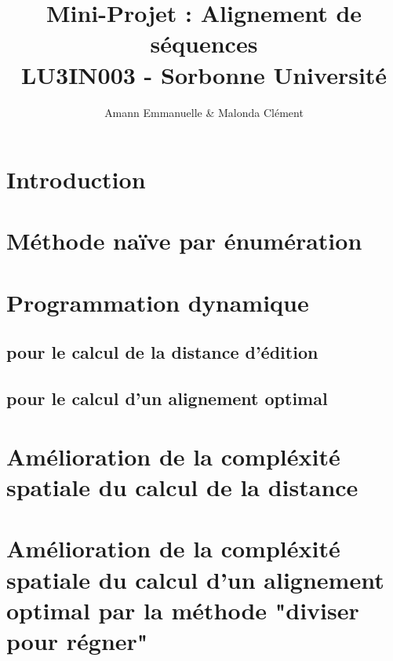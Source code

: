 \documentclass[12pt]{article}
\begin{document}
\title{Mini-Projet : Alignement de séquences \\ LU3IN003 - Sorbonne Université}
\author{Amann Emmanuelle \& Malonda Clément}
\maketitle
\tableofcontents
\newpage

\section{Introduction}

\section{Méthode naïve par énumération}

\newpage
\section{Programmation dynamique}
\subsection{pour le calcul de la distance d'édition}

\newpage
\subsection{pour le calcul d'un alignement optimal}

\newpage
\section{Amélioration de la compléxité spatiale du calcul de la distance}

\newpage
\section{Amélioration de la compléxité spatiale du calcul d'un alignement optimal par la méthode "diviser pour régner"}

\end{document}
